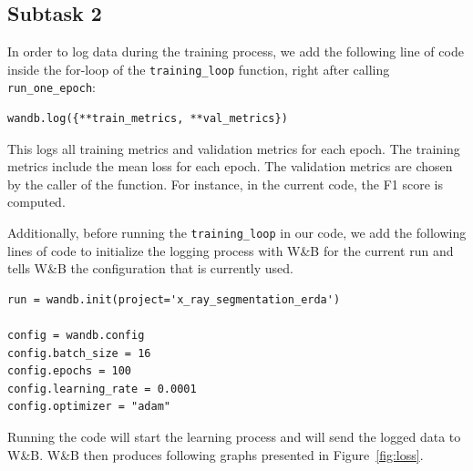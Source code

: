 \subsection*{Subtask 2}

In order to log data during the training process, we add the following line of code inside the for-loop of the \lstinline|training_loop| function, right after calling \lstinline|run_one_epoch|:
\begin{lstlisting}
wandb.log({**train_metrics, **val_metrics})
\end{lstlisting}
This logs all training metrics and validation metrics for each epoch. The training metrics include the mean loss for each epoch. The validation metrics are chosen by the caller of the function. For instance, in the current code, the F1 score is computed.

Additionally, before running the \lstinline|training_loop| in our code, we add the following lines of code to initialize the logging process with W\&B for the current run and tells W\&B the configuration that is currently used.
\begin{lstlisting}
run = wandb.init(project='x_ray_segmentation_erda')

config = wandb.config
config.batch_size = 16
config.epochs = 100
config.learning_rate = 0.0001
config.optimizer = "adam"
\end{lstlisting}
Running the code will start the learning process and will send the logged data to W\&B. W\&B then produces following graphs presented in Figure~\ref{fig:loss}. 

